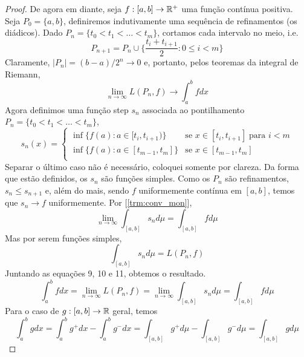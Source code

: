 \begin{proof}
    De agora em diante, seja $f:[a,b] \rightarrow \mathbb{R}^+$ uma função contínua positiva.
    Seja $P_0 = \{a,b\}$, definiremos indutivamente uma sequência de refinamentos (os diádicos).
    Dado $P_n = \{t_0 < t_1 < \dots < t_m\}$, cortamos cada intervalo no meio, i.e.
    $$P_{n+1} = P_n \cup \bigg\{\frac{t_i + t_{i+1}}{2} : 0 \leq i < m\bigg\}$$
    Claramente, $|P_n| = (b-a)/2^n \to 0$ e, portanto, pelos teoremas da integral de Riemann,
    \begin{equation}
        \lim_{n \to \infty} L(P_n,f) \to \int_a^b fdx
    \end{equation}
    Agora definimos uma função step $s_n$ associada ao pontilhamento $P_n = \{t_0 < t_1 < \dots < t_m\}$,
    $$s_n(x) = \begin{cases}
        \inf\{f(a): a \in [t_i, t_{i+1})\} & \text{se } x \in [t_i, t_{i+1}]\; \text{para } i < m\\
        \inf\{f(a): a \in [t_{m-1}, t_{m}]\} & \text{se } x \in [t_{m-1}, t_{m}]\\
    \end{cases}$$
    Separar o último caso não é necessário, coloquei somente por clareza. Da forma que estão definidos,
    os $s_n$ são funções simples. Como os $P_n$ são refinamentos, $s_{n} \leq s_{n+1}$ e, além do mais,
    sendo $f$ uniformemente contínua em $[a,b]$, temos que $s_n \to f$ uniformemente. Por [\ref{trm:conv_mon}],
    \begin{equation}
        \lim_{n\to \infty} \int_{[a,b]} s_n d\mu= \int_{[a,b]} f d\mu
    \end{equation}
    Mas por serem funções simples,
    \begin{equation}
        \int_{[a,b]} s_n d\mu = L(P_n, f)
    \end{equation}
    Juntando as equações 9, 10 e 11, obtemos o resultado.
    $$\int_a^b fdx = \lim_{n \to \infty} L(P_n, f) = \lim_{n\to\infty }\int_{[a,b]} s_n d\mu = \int_{[a,b]} fd\mu$$
    Para o caso de $g : [a,b] \rightarrow \mathbb{R}$ geral, temos 
    $$\int_{a}^{b} g dx = \int_{a}^{b} g^+ dx - \int_{a}^{b} g^- dx = \int_{[a,b]}g^+ d\mu - \int_{[a,b]}g^- d\mu = \int_{[a,b]}g d\mu$$ 
\end{proof}

